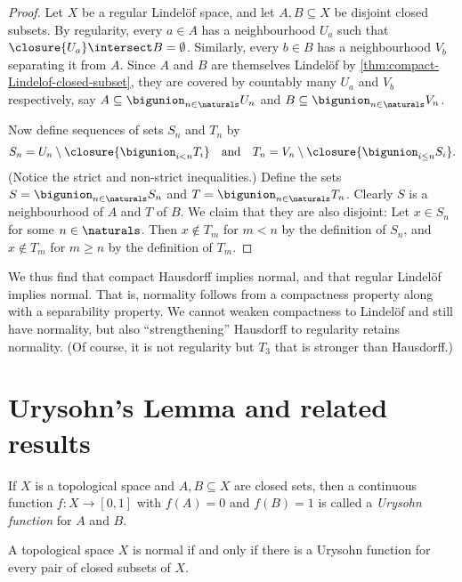 \documentclass[article, a4paper, 11pt, oneside]{memoir}
\numberwithin{equation}{chapter}
\begin{document}
\begin{proof}
    Let $X$ be a regular Lindelöf space, and let $A,B \subseteq X$ be disjoint closed subsets. By regularity, every $a \in A$ has a neighbourhood $U_a$ such that $\closure{U_a} \intersect B = \emptyset$. Similarly, every $b \in B$ has a neighbourhood $V_b$ separating it from $A$. Since $A$ and $B$ are themselves Lindelöf by \cref{thm:compact-Lindelof-closed-subset}, they are covered by countably many $U_a$ and $V_b$ respectively, say $A \subseteq \bigunion_{n \in \naturals} U_n$ and $B \subseteq \bigunion_{n \in \naturals} V_n$.

    Now define sequences of sets $S_n$ and $T_n$ by
    \begin{equation*}
        S_n = U_n \setminus \closure{ \bigunion_{i < n} T_i}
        \quad \text{and} \quad
        T_n = V_n \setminus \closure{ \bigunion_{i \leq n} S_i}.
    \end{equation*}
    (Notice the strict and non-strict inequalities.) Define the sets $S = \bigunion_{n \in \naturals} S_n$ and $T = \bigunion_{n \in \naturals} T_n$. Clearly $S$ is a neighbourhood of $A$ and $T$ of $B$. We claim that they are also disjoint: Let $x \in S_n$ for some $n \in \naturals$. Then $x \not\in T_m$ for $m < n$ by the definition of $S_n$, and $x \not\in T_m$ for $m \geq n$ by the definition of $T_m$. 
\end{proof}

We thus find that compact Hausdorff implies normal, and that regular Lindelöf implies normal. That is, normality follows from a compactness property along with a separability property. We cannot weaken compactness to Lindelöf and still have normality, but also \enquote{strengthening} Hausdorff to regularity retains normality. (Of course, it is not regularity but $T_3$ that is stronger than Hausdorff.)


\section{Urysohn's Lemma and related results}

If $X$ is a topological space and $A,B \subseteq X$ are closed sets, then a continuous function $f \colon X \to [0,1]$ with $f(A) = 0$ and $f(B) = 1$ is called a \emph{Urysohn function} for $A$ and $B$.

\begin{theorem}
    A topological space $X$ is normal if and only if there is a Urysohn function for every pair of closed subsets of $X$.
\end{theorem}
\end{document}
